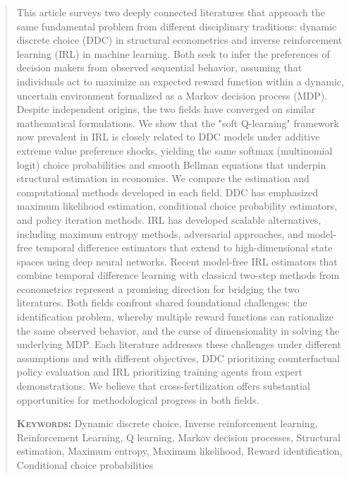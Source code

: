 \documentclass[11pt]{article}
\begin{document}
\begin{singlespace}
\begin{abstract}
This article surveys two deeply connected literatures that approach the same fundamental problem from different disciplinary traditions: dynamic discrete choice (DDC) in structural econometrics and inverse reinforcement learning (IRL) in machine learning. Both seek to infer the preferences of decision makers from observed sequential behavior, assuming that individuals act to maximize an expected reward function within a dynamic, uncertain environment formalized as a Markov decision process (MDP). Despite independent origins, the two fields have converged on similar mathematical formulations. We show that the "soft Q-learning" framework now prevalent in IRL is closely related to DDC models under additive extreme value preference shocks, yielding the same softmax (multinomial logit) choice probabilities and smooth Bellman equations that underpin structural estimation in economics. We compare the estimation and computational methods developed in each field. DDC has emphasized maximum likelihood estimation, conditional choice probability estimators, and policy iteration methods. IRL has developed scalable alternatives, including maximum entropy methods, adversarial approaches, and model-free temporal difference estimators that extend to high-dimensional state spaces using deep neural networks. Recent model-free IRL estimators that combine temporal difference learning with classical two-step methods from econometrics represent a promising direction for bridging the two literatures. Both fields confront shared foundational challenges: the identification problem, whereby multiple reward functions can rationalize the same observed behavior, and the curse of dimensionality in solving the underlying MDP. Each literature addresses these challenges under different assumptions and with different objectives, DDC prioritizing counterfactual policy evaluation and IRL prioritizing training agents from expert demonstrations. We believe that cross-fertilization offers substantial opportunities for methodological progress in both fields.



\bigskip
\noindent \textsc{\bf Keywords:}
Dynamic discrete choice, Inverse reinforcement learning, Reinforcement Learning, Q learning,
Markov decision processes, Structural estimation, Maximum entropy, Maximum likelihood,
Reward identification, Conditional choice probabilities 
\end{abstract}
\end{singlespace}
\thispagestyle{empty}
\clearpage
\egroup
\setcounter{page}{1}
\end{document}
